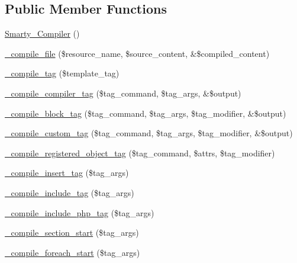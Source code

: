 \subsection*{Public Member Functions}
\begin{DoxyCompactItemize}
\item 
\mbox{\hyperlink{class_smarty___compiler_ad6ab19d93f6afc09b6fa7a09947f7a20}{Smarty\+\_\+\+Compiler}} ()
\item 
\mbox{\hyperlink{class_smarty___compiler_acfef9359d4a045b3c17bb36c713d80dc}{\+\_\+compile\+\_\+file}} (\$resource\+\_\+name, \$source\+\_\+content, \&\$compiled\+\_\+content)
\item 
\mbox{\hyperlink{class_smarty___compiler_a2a8edf6c0079fb0fa53d98837f17ff8c}{\+\_\+compile\+\_\+tag}} (\$template\+\_\+tag)
\item 
\mbox{\hyperlink{class_smarty___compiler_a7436c858b44c88f75ac8e91480c778c1}{\+\_\+compile\+\_\+compiler\+\_\+tag}} (\$tag\+\_\+command, \$tag\+\_\+args, \&\$output)
\item 
\mbox{\hyperlink{class_smarty___compiler_aa2e5d024c2c566aa9baeb4636928de18}{\+\_\+compile\+\_\+block\+\_\+tag}} (\$tag\+\_\+command, \$tag\+\_\+args, \$tag\+\_\+modifier, \&\$output)
\item 
\mbox{\hyperlink{class_smarty___compiler_af172dbd373fed01b38c00d0afa8b2cbe}{\+\_\+compile\+\_\+custom\+\_\+tag}} (\$tag\+\_\+command, \$tag\+\_\+args, \$tag\+\_\+modifier, \&\$output)
\item 
\mbox{\hyperlink{class_smarty___compiler_ae513c736559da523560a8699db475881}{\+\_\+compile\+\_\+registered\+\_\+object\+\_\+tag}} (\$tag\+\_\+command, \$attrs, \$tag\+\_\+modifier)
\item 
\mbox{\hyperlink{class_smarty___compiler_a155076f7f3939480a7cbb17ae1b79d7d}{\+\_\+compile\+\_\+insert\+\_\+tag}} (\$tag\+\_\+args)
\item 
\mbox{\hyperlink{class_smarty___compiler_ad57897c82c75a0a37868853a544368d5}{\+\_\+compile\+\_\+include\+\_\+tag}} (\$tag\+\_\+args)
\item 
\mbox{\hyperlink{class_smarty___compiler_a92a50ae51f7da35e56d58065d2f880ef}{\+\_\+compile\+\_\+include\+\_\+php\+\_\+tag}} (\$tag\+\_\+args)
\item 
\mbox{\hyperlink{class_smarty___compiler_ab1362bbbec0dd0376e46c46c7af6fe4e}{\+\_\+compile\+\_\+section\+\_\+start}} (\$tag\+\_\+args)
\item 
\mbox{\hyperlink{class_smarty___compiler_a84b4644d15ae71ec55412e8c26cd702b}{\+\_\+compile\+\_\+foreach\+\_\+start}} (\$tag\+\_\+args)

\end{DoxyCompactItemize}
